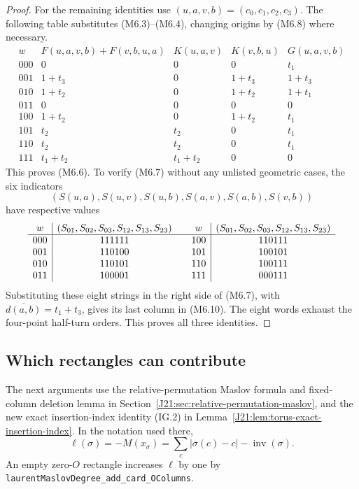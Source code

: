 \documentclass[11pt,oneside]{report}
\theoremstyle{definition}
\numberwithin{equation}{section}
\newcommand{\decl}[1]{\textnormal{\nolinkurl{#1}}}
\begin{document}
\begin{proof}
For the remaining identities use
$(u,a,v,b)=(c_0,c_1,c_2,c_3)$.
The following table substitutes (M6.3)--(M6.4), changing origins by
(M6.8) where necessary.
\[
\begin{array}{c|c|c|c|c}
 w&F(u,a,v,b)+F(v,b,u,a)&K(u,a,v)&K(v,b,u)&G(u,a,v,b)\\ \hline
 000&0&0&0&t_1\\
 001&1+t_3&0&1+t_3&1+t_3\\
 010&1+t_2&0&1+t_2&1+t_1\\
 011&0&0&0&0\\
 100&1+t_2&0&1+t_2&t_1\\
 101&t_2&t_2&0&t_1\\
 110&t_2&t_2&0&t_1\\
 111&t_1+t_2&t_1+t_2&0&0
\end{array}
 \tag{M6.10}
\]
This proves (M6.6). To verify (M6.7) without any unlisted geometric
cases, the six indicators
\[
 (S(u,a),S(u,v),S(u,b),S(a,v),S(a,b),S(v,b))
\]
have respective values
\[
\begin{array}{c|c@{\qquad}c|c}
 w&(S_{01},S_{02},S_{03},S_{12},S_{13},S_{23})
 &w&(S_{01},S_{02},S_{03},S_{12},S_{13},S_{23})\\ \hline
 000&111111&100&110111\\
 001&110100&101&100101\\
 010&110101&110&100111\\
 011&100001&111&000111
\end{array}
\]
Substituting these eight strings in the right side of (M6.7), with
$\overline{d(a,b)}=t_1+t_3$, gives its last column in (M6.10).
The eight words exhaust the four-point half-turn orders. This proves
all three identities.
\end{proof}

\subsection{Which rectangles can contribute}

The next arguments use the relative-permutation Maslov formula and
fixed-column deletion lemma in Section~\ref{J21:sec:relative-permutation-maslov},
and the new exact insertion-index identity (IG.2) in
Lemma~\ref{J21:lem:torus-exact-insertion-index}. In the notation used there,
\[
 \ell(\sigma)=-M(x_\sigma)
       =\sum_c|\sigma(c)-c|-\operatorname{inv}(\sigma).
 \tag{M6.11}
\]
An empty zero-$O$ rectangle increases $\ell$ by one by
\decl{laurentMaslovDegree_add_card_OColumns}.
\end{document}
